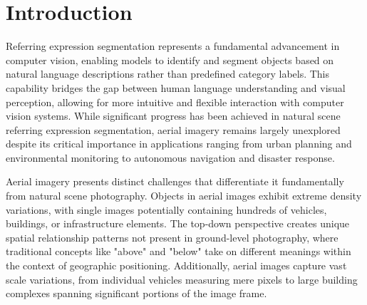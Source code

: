 
\section{Introduction}
\label{sec:intro}

Referring expression segmentation represents a fundamental advancement in computer vision, enabling models to identify and segment objects based on natural language descriptions rather than predefined category labels. This capability bridges the gap between human language understanding and visual perception, allowing for more intuitive and flexible interaction with computer vision systems. While significant progress has been achieved in natural scene referring expression segmentation, aerial imagery remains largely unexplored despite its critical importance in applications ranging from urban planning and environmental monitoring to autonomous navigation and disaster response.

Aerial imagery presents distinct challenges that differentiate it fundamentally from natural scene photography. Objects in aerial images exhibit extreme density variations, with single images potentially containing hundreds of vehicles, buildings, or infrastructure elements. The top-down perspective creates unique spatial relationship patterns not present in ground-level photography, where traditional concepts like "above" and "below" take on different meanings within the context of geographic positioning. Additionally, aerial images capture vast scale variations, from individual vehicles measuring mere pixels to large building complexes spanning significant portions of the image frame.

